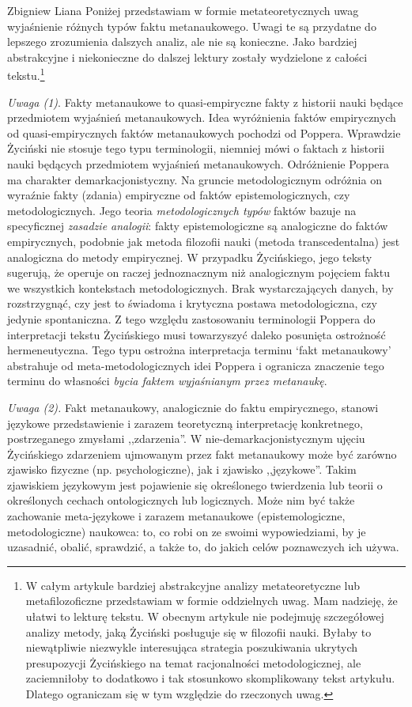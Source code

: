 \begin{artplenv}{Zbigniew Liana}
Poniżej przedstawiam w formie metateoretycznych uwag wyjaśnienie różnych typów faktu metanaukowego. Uwagi te są
przydatne do lepszego zrozumienia dalszych analiz, ale nie są konieczne. Jako bardziej abstrakcyjne i niekonieczne do
dalszej lektury zostały wydzielone z całości tekstu.\footnote{W całym artykule bardziej abstrakcyjne analizy
	metateoretyczne lub metafilozoficzne przedstawiam w formie oddzielnych uwag. Mam nadzieję, że ułatwi to lekturę tekstu.
	W obecnym artykule nie podejmuję szczegółowej analizy metody, jaką Życiński posługuje się w filozofii nauki. Byłaby to
	niewątpliwie niezwykle interesująca strategia poszukiwania ukrytych presupozycji Życińskiego na temat racjonalności
	metodologicznej, ale zaciemniłoby to dodatkowo i tak stosunkowo skomplikowany tekst artykułu. Dlatego ograniczam się w
	tym względzie do rzeczonych uwag.}

\textit{Uwaga (1)}. Fakty metanaukowe to quasi-empiryczne fakty z historii nauki będące przedmiotem wyjaśnień
metanaukowych. Idea wyróżnienia faktów empirycznych od quasi-empirycznych faktów metanaukowych pochodzi od Poppera.
Wprawdzie Życiński nie stosuje tego typu terminologii, niemniej mówi o faktach z historii nauki będących przedmiotem
wyjaśnień metanaukowych. Odróżnienie Poppera ma charakter demarkacjonistyczny. Na gruncie metodologicznym odróżnia on
wyraźnie fakty (zdania) empiryczne od faktów epistemologicznych, czy metodologicznych. Jego teoria
\textit{metodologicznych typów} faktów bazuje na specyficznej \textit{zasadzie analogii}: fakty epistemologiczne są
analogiczne do faktów empirycznych, podobnie jak metoda filozofii nauki (metoda transcedentalna) jest analogiczna do
metody empirycznej. W przypadku Życińskiego, jego teksty sugerują, że operuje on raczej jednoznacznym niż analogicznym
pojęciem faktu we wszystkich kontekstach metodologicznych. Brak wystarczających danych, by rozstrzygnąć, czy jest to
świadoma i krytyczna postawa metodologiczna, czy jedynie spontaniczna. Z tego względu zastosowaniu terminologii Poppera
do interpretacji tekstu Życińskiego musi towarzyszyć daleko posunięta ostrożność hermeneutyczna. Tego typu ostrożna
interpretacja terminu ‘fakt metanaukowy’ abstrahuje od meta-metodologicznych idei Poppera i ogranicza znaczenie tego
terminu do własności \textit{bycia faktem wyjaśnianym przez metanaukę}.

\textit{Uwaga (2).} Fakt metanaukowy, analogicznie do faktu empirycznego, stanowi językowe przedstawienie i zarazem
teoretyczną interpretację konkretnego, postrzeganego zmysłami ,,zdarzenia''. W nie-demarkacjonistycznym ujęciu
Życińskiego zdarzeniem ujmowanym przez fakt metanaukowy może być zarówno zjawisko fizyczne (np. psychologiczne), jak i
zjawisko ,,językowe''. Takim zjawiskiem językowym jest pojawienie się określonego twierdzenia lub teorii o określonych
cechach ontologicznych lub logicznych. Może nim być także zachowanie meta-językowe i zarazem metanaukowe
(epistemologiczne, metodologiczne) naukowca: to, co robi on ze swoimi wypowiedziami, by je uzasadnić, obalić,
sprawdzić, a także to, do jakich celów poznawczych ich używa.


\end{artplenv}
